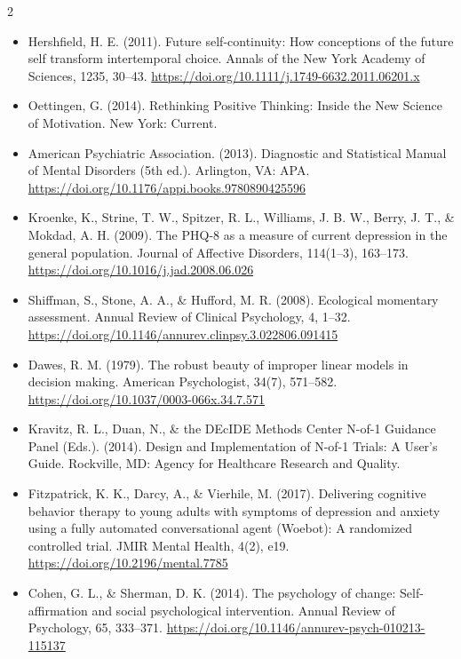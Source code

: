 \documentclass[10pt]{article}
\theoremstyle{definition}
\theoremstyle{remark}
\begin{document}
\begin{multicols}{2}
\begin{itemize}[leftmargin=1em,itemsep=0pt,topsep=1pt,parsep=0pt]
\item Hershfield, H. E. (2011). Future self-continuity: How conceptions of the future self transform intertemporal choice. Annals of the New York Academy of Sciences, 1235, 30--43. \url{https://doi.org/10.1111/j.1749-6632.2011.06201.x}
\item Oettingen, G. (2014). Rethinking Positive Thinking: Inside the New Science of Motivation. New York: Current.
\item American Psychiatric Association. (2013). Diagnostic and Statistical Manual of Mental Disorders (5th ed.). Arlington, VA: APA. \url{https://doi.org/10.1176/appi.books.9780890425596}
\item Kroenke, K., Strine, T. W., Spitzer, R. L., Williams, J. B. W., Berry, J. T., \& Mokdad, A. H. (2009). The PHQ-8 as a measure of current depression in the general population. Journal of Affective Disorders, 114(1--3), 163--173. \url{https://doi.org/10.1016/j.jad.2008.06.026}
\item Shiffman, S., Stone, A. A., \& Hufford, M. R. (2008). Ecological momentary assessment. Annual Review of Clinical Psychology, 4, 1--32. \url{https://doi.org/10.1146/annurev.clinpsy.3.022806.091415}
\item Dawes, R. M. (1979). The robust beauty of improper linear models in decision making. American Psychologist, 34(7), 571--582. \url{https://doi.org/10.1037/0003-066x.34.7.571}
\item Kravitz, R. L., Duan, N., \& the DEcIDE Methods Center N-of-1 Guidance Panel (Eds.). (2014). Design and Implementation of N-of-1 Trials: A User's Guide. Rockville, MD: Agency for Healthcare Research and Quality.
\item Fitzpatrick, K. K., Darcy, A., \& Vierhile, M. (2017). Delivering cognitive behavior therapy to young adults with symptoms of depression and anxiety using a fully automated conversational agent (Woebot): A randomized controlled trial. JMIR Mental Health, 4(2), e19. \url{https://doi.org/10.2196/mental.7785}
\item Cohen, G. L., \& Sherman, D. K. (2014). The psychology of change: Self-affirmation and social psychological intervention. Annual Review of Psychology, 65, 333--371. \url{https://doi.org/10.1146/annurev-psych-010213-115137}
\end{itemize}

\end{multicols}
\end{document}
